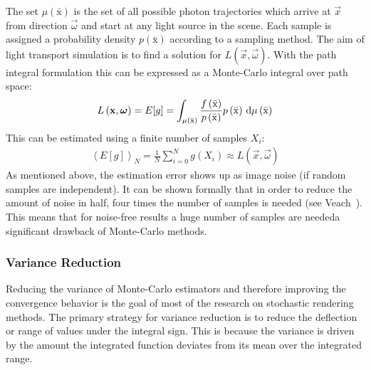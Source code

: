 The set $\mu\left(\bar{\mathrm{x}}\right)$ is the set of all possible photon trajectories which arrive at $\vec{x}$ from direction $\vec{\omega}$ and start at any light source in the scene. Each sample is assigned a probability density $p\left(\bar{\mathrm{x}}\right)$ according to a sampling method. The aim of light transport simulation is to find a solution for $L(\vec{x}, \vec{\omega})$. With the path integral formulation this can be expressed as a Monte-Carlo integral over path space:
\begin{align}
L\left(\boldsymbol{\mathbf{x}},\boldsymbol{\mathbf{\omega}}\right) = E[g] = \int_{\mu\left(\bar{\mathrm{x}}\right)} \frac{f\left(\bar{\mathrm{x}}\right)}{p\left(\bar{\mathrm{x}}\right)}p\left(\bar{\mathrm{x}}\right)
\,\mathrm{d}\mu\left(\bar{\mathrm{x}}\right)
\end{align}
This can be estimated using a finite number of samples $X_i$:
\begin{align}
\left<E[g]\right>_N = 
\frac{1}{N}\sum_{i=0}^{N}
g\left(X_i\right)
\approx
L\left(\vec{x},\vec{\omega}\right)
\end{align}
As mentioned above, the estimation error shows up as image noise (if random samples are independent). It can be shown formally that in order to reduce the amount of noise in half, four times the number of samples is needed (see Veach~\cite{VeachThesis97}). This means that for noise-free results a huge number of samples are needed\mydash a significant drawback of Monte-Carlo methods.

\subsubsection*{Variance Reduction}

Reducing the variance of Monte-Carlo estimators and therefore improving the convergence behavior is the goal of most of the research on stochastic rendering methods. The primary strategy for variance reduction is to reduce the deflection or range of values under the integral sign. This is because the variance is driven by the amount the integrated function deviates from its mean over the integrated range.

